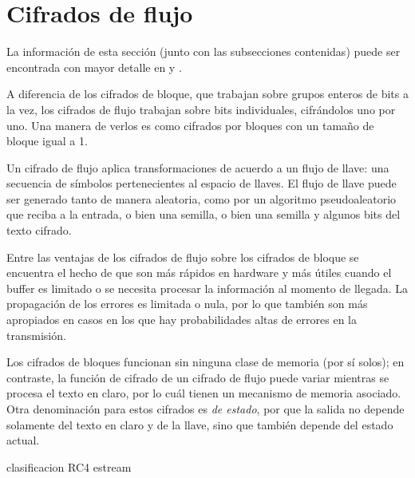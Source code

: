 %
%

\section{Cifrados de flujo}
\label{sec:flujo}

La información de esta sección (junto con las subsecciones contenidas) puede
ser encontrada con mayor detalle en \cite{menezes, stallings} y
\cite{alan_konheim}.

A diferencia de los cifrados de bloque, que trabajan sobre grupos enteros de
bits a la vez, los cifrados de flujo trabajan sobre bits individuales,
cifrándolos uno por uno. Una manera de verlos es como cifrados por bloques con
un tamaño de bloque igual a 1.

Un cifrado de flujo aplica transformaciones de acuerdo a un flujo de llave:
una secuencia de símbolos pertenecientes al espacio de llaves. El flujo de
llave puede ser generado tanto de manera aleatoria, como por un algoritmo
pseudoaleatorio que reciba a la entrada, o bien una semilla, o bien una
semilla y algunos bits del texto cifrado.

Entre las ventajas de los cifrados de flujo sobre los cifrados de bloque se
encuentra el hecho de que son más rápidos en hardware y más útiles cuando
el buffer es limitado o se necesita procesar la información al momento de
llegada. La propagación de los errores es limitada o nula, por lo que también
son más apropiados en casos en los que hay probabilidades altas de errores en
la transmisión.

Los cifrados de bloques funcionan sin ninguna clase de memoria (por sí solos);
en contraste, la función de cifrado de un cifrado de flujo puede variar
mientras se procesa el texto en claro, por lo cuál tienen un mecanismo de
memoria asociado. Otra denominación para estos cifrados es \textit{de estado},
por que la salida no depende solamente del texto en claro y de la llave, sino
que también depende del estado actual.

{clasificacion}
{RC4}
{estream}
